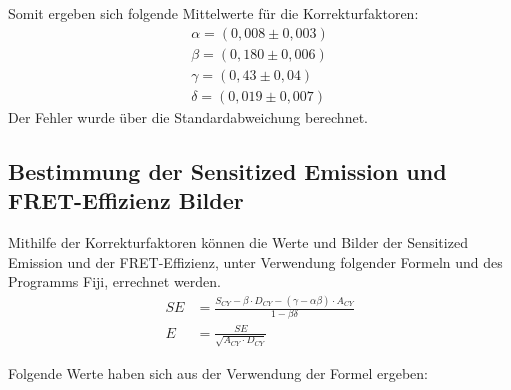 Somit ergeben sich folgende Mittelwerte für die Korrekturfaktoren: 
\begin{align}
    \alpha = (0,008 \pm 0,003)\\
    \beta = (0,180 \pm 0,006)\\
    \gamma = (0,43 \pm 0,04)\\
    \delta = (0,019 \pm 0,007)
\end{align}
Der Fehler wurde über die Standardabweichung berechnet.

\newpage
\subsection{Bestimmung der Sensitized Emission und FRET-Effizienz Bilder}

Mithilfe der Korrekturfaktoren können die Werte und Bilder der Sensitized Emission und der FRET-Effizienz, unter Verwendung folgender Formeln und des Programms Fiji, errechnet werden.
\begin{align}
    SE &= \frac{S_{CY} - \beta \cdot D_{CY} - (\gamma -\alpha \beta)\cdot A_{CY}}{1 - \beta \delta} \\
    E &= \frac{SE}{\sqrt{A_{CY} \cdot D_{CY}}}
\end{align}


Folgende Werte haben sich aus der Verwendung der Formel ergeben:\\

